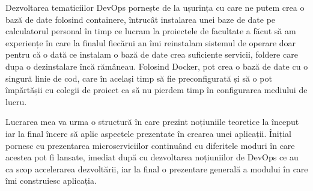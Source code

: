 Dezvoltarea tematiciilor DevOps pornește de la ușurința cu care ne putem crea o bază de date folosind containere,
întrucât instalarea unei baze de date pe calculatorul personal în timp ce lucram la proiectele de facultate a făcut
să am experiențe în care la finalul fiecărui an îmi reinstalam sistemul de operare doar pentru că o dată ce instalam
o bază de date crea suficiente servicii, foldere care dupa o dezinstalare încă rămâneau. Folosind Docker,
pot crea o bază de date cu o singură linie de cod, care în același timp să fie preconfigurată și să o pot
împărtășii cu colegii de proiect ca să nu pierdem timp în configurarea mediului de lucru. 

Lucrarea mea va urma o structură în care prezint noțiuniile teoretice la început iar la final încerc să
aplic aspectele prezentate în crearea unei aplicații. Înițial pornesc cu prezentarea microserviciilor 
continuând cu diferitele moduri în care acestea pot fi lansate, imediat după cu dezvoltarea noțiuniilor de DevOps
ce au ca scop accelerarea dezvoltării, iar la final o prezentare generală a modului în care îmi construiesc aplicația.
